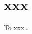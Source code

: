 

\section*{xxx}

\begin{myConceptSteps}{To xxx\dots}
\end{myConceptSteps}

\myBlankExample{3in}{
}

